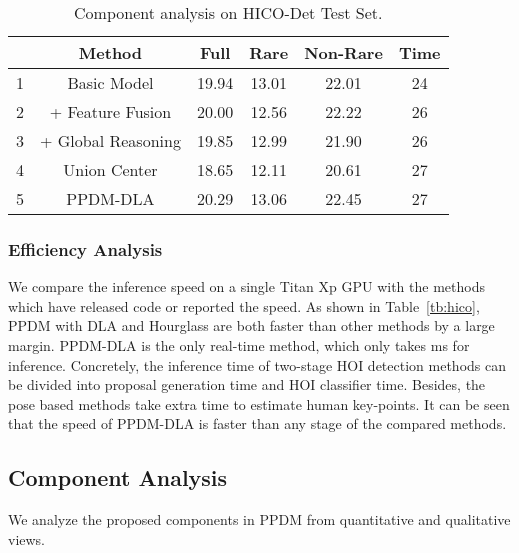 \documentclass[10pt,twocolumn,letterpaper]{article}
\begin{document}
\begin{table}[htb!]
\vspace{-2mm}
  \begin{center}
  \footnotesize
  \begin{tabular}{|c|ccccc|}
    \hline
  &Method           &Full & Rare & Non-Rare & Time \\
  \hline
   1&Basic Model& 19.94 &13.01& 22.01&24 \\
  2&+ Feature Fusion& 20.00 &12.56& 22.22& 26\\
  3&+ Global Reasoning& 19.85 &12.99 & 21.90& 26\\
  \hline
  4&Union Center & 18.65 & 12.11 &20.61& 27 \\ \hline
  5& PPDM-DLA & 20.29 &13.06 & 22.45 & 27 \\ \hline
  
  \end{tabular}
  \end{center}
  \vspace{-2mm}
  \caption{Component analysis on HICO-Det Test Set.}
  \label{tb:abla}
    \vspace{-5mm}
 \end{table}

\vspace{-3mm}
\subsubsection{Efficiency Analysis}
\vspace{-2mm}
We compare the inference speed on a single Titan Xp GPU with the methods which have released code or reported the speed. As shown in Table~\ref{tb:hico}, PPDM with DLA and Hourglass are both faster than other methods by a large margin. PPDM-DLA is the only real-time method, which only takes ms for inference. Concretely, the inference time of two-stage HOI detection methods can be divided into proposal generation time and  HOI classifier time.
Besides, the pose based methods take extra time to estimate human key-points. It can be seen that the speed of PPDM-DLA is faster than any stage of the compared methods.

\vspace{-3mm}
\subsection{Component Analysis}
\vspace{-2mm}

We analyze the proposed components in PPDM from quantitative and  qualitative views.
\end{document}
